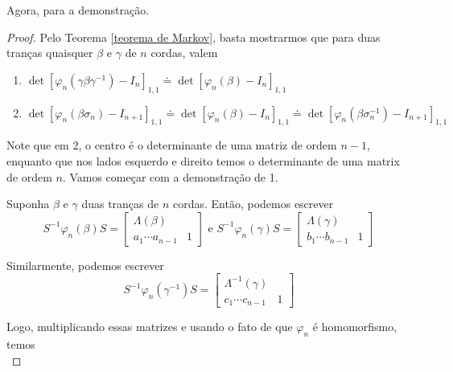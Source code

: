 \documentclass[a4paper,portuguese,11pt,twoside, leqno]{book}
\theoremstyle{definition}
\begin{document}
	\par\vspace{0.3cm} Agora, para a demonstração.
	\begin{proof}
		Pelo Teorema \eqref{teorema de Markov}, basta mostrarmos que para duas tranças quaisquer $\beta$ e $\gamma$ de $n$ cordas, valem
		\begin{enumerate}
			\item $\det[\varphi_n(\gamma\beta\gamma^{-1}) - I_n]_{1,1} \doteq \det[\varphi_n(\beta) - I_n]_{1,1}$
			\item $\det[\varphi_n(\beta\sigma_n) - I_{n+1}]_{1,1}\doteq\det[\varphi_n(\beta) - I_n]_{1,1} \doteq \det[\varphi_n(\beta\sigma_n^{-1}) - I_{n+1}]_{1,1}$
		\end{enumerate}
		\par\vspace{0.3cm} Note que em 2, o centro é o determinante de uma matriz de ordem $n-1$, enquanto que nos lados esquerdo e direito temos o determinante de uma matrix de ordem $n$. Vamos começar com a demonstração de 1.
		\par\vspace{0.3cm} Suponha $\beta$ e $\gamma$ duas tranças de $n$ cordas. Então, podemos escrever
		\begin{equation*}
		S^{-1}\varphi_n(\beta)S = \left[ \begin{array}{c|c}
		\Lambda(\beta) & \\
		\hline
		a_1\cdots a_{n-1} & 1
		\end{array}\right] \text{ e } 
		S^{-1}\varphi_n(\gamma)S = \left[  \begin{array}{c|c}
		\Lambda(\gamma) & \\
		\hline 
		b_1 \cdots b_{n-1} & 1
		\end{array}\right]  
		\end{equation*}
		\par\vspace{0.3cm} Similarmente, podemos escrever
		\begin{equation*}
		S^{-1}\varphi_n(\gamma^{-1})S = \left[\begin{array}{c|c}
		\Lambda^{-1}(\gamma) & \\
		\hline 
		c_1\cdots c_{n-1} & 1
		\end{array}\right]
		\end{equation*}
		\par\vspace{0.3cm} Logo, multiplicando essas matrizes e usando o fato de que $\varphi_n$ é homomorfismo, temos
		\begin{equation*}

\end{equation*}
\end{proof}
\end{document}
